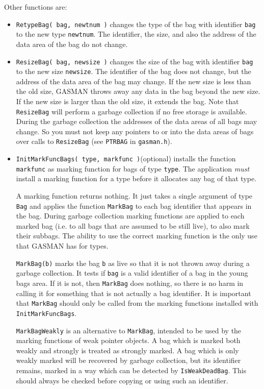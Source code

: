 \documentclass[a4paper,11pt]{report}
\begin{document}
{{{ Other functions are: 
\begin{itemize}
\item  \texttt{RetypeBag( bag, newtnum )} changes the type of the bag with identifier \texttt{bag} to the new type \texttt{newtnum}. The identifier, the size, and also the address of the data area of the bag
do not change. 
\item  \texttt{ResizeBag( bag, newsize )} changes the size of the bag with identifier \texttt{bag} to the new size \texttt{newsize}. The identifier of the bag does not change, but the address of the data area
of the bag may change. If the new size is less than the old size, \textsf{GASMAN} throws away any data in the bag beyond the new size. If the new size is larger
than the old size, it extends the bag. Note that \texttt{ResizeBag} will perform a garbage collection if no free storage is available. During the
garbage collection the addresses of the data areas of all bags may change. So
you must not keep any pointers to or into the data areas of bags over calls to \texttt{ResizeBag} (see \texttt{PTR{\textunderscore}BAG} in \texttt{gasman.h}). 
\item  \texttt{InitMarkFuncBags( type, mark\texttt{}func )}(optional) installs the function \texttt{mark\texttt{}func} as marking function for bags of type \texttt{type}. The application \emph{must} install a marking function for a type before it allocates any bag of that
type. 

 A marking function returns nothing. It just takes a single argument of type \texttt{Bag} and applies the function \texttt{MarkBag} to each bag identifier that appears in the bag. During garbage collection
marking functions are applied to each marked bag (i.e. to all bags that are
assumed to be still live), to also mark their subbags. The ability to use the
correct marking function is the only use that \textsf{GASMAN} has for types. 

 \texttt{MarkBag(b)} marks the bag \texttt{b} as live so that it is not thrown away during a garbage collection. It tests if \texttt{bag} is a valid identifier of a bag in the young bags area. If it is not, then \texttt{MarkBag} does nothing, so there is no harm in calling it for something that is not
actually a bag identifier. It is important that \texttt{MarkBag} should only be called from the marking functions installed with \texttt{InitMarkFuncBags}. 

 \texttt{MarkBagWeakly} is an alternative to \texttt{MarkBag}, intended to be used by the marking functions of weak pointer objects. A bag
which is marked both weakly and strongly is treated as strongly marked. A bag
which is only weakly marked will be recovered by garbage collection, but its
identifier remains, marked in a way which can be detected by \texttt{IsWeakDeadBag}. This should always be checked before copying or using such an identifier. 


\end{itemize}}}}
\end{document}

